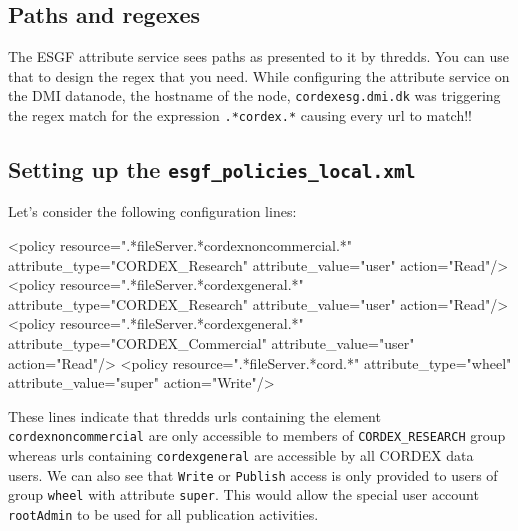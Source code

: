 \subsection{Paths and regexes}
The ESGF attribute service sees paths as presented to it by thredds. You can use that to design the regex that you need.  While configuring the attribute service on the DMI datanode, the hostname of the node, \texttt{cordexesg.dmi.dk} was triggering the regex match for the expression \texttt{.*cordex.*} causing every url to match!!
\subsection{Setting up the \texttt{esgf\_policies\_local.xml}}
Let's consider the following configuration lines:
\begin{tiny}
\begin{verbatimtab}[4]
<policy resource=".*fileServer.*cordexnoncommercial.*" attribute_type="CORDEX_Research" attribute_value="user" action="Read"/>
<policy resource=".*fileServer.*cordexgeneral.*" attribute_type="CORDEX_Research" attribute_value="user" action="Read"/>
<policy resource=".*fileServer.*cordexgeneral.*" attribute_type="CORDEX_Commercial" attribute_value="user" action="Read"/>
<policy resource=".*fileServer.*cord.*" attribute_type="wheel" attribute_value="super" action="Write"/>
\end{verbatimtab}
\end{tiny}
These lines indicate that thredds urls containing the element \texttt{cordexnoncommercial} are only accessible to members of \texttt{CORDEX\_RESEARCH} group whereas urls containing \texttt{cordexgeneral} are accessible by all CORDEX data users. We can also see that \texttt{Write} or \texttt{Publish} access is only provided to users of group \texttt{wheel} with attribute \texttt{super}. This would allow the special user account \texttt{rootAdmin} to be used for all publication activities.
